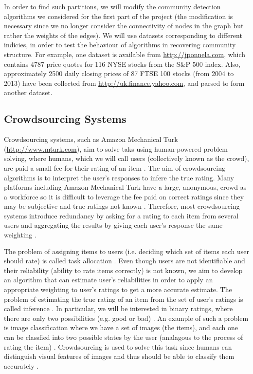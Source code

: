 \documentclass[12pt]{article}
\numberwithin{equation}{section}
\begin{document}
In order to find such partitions, we will modify the community detection algorithms we considered for the first part of the project (the modification is necessary since we no longer consider the connectivity of nodes in the graph but rather the weights of the edges). We will use datasets corresponding to different indicies, in order to test the behaviour of algorithms in recovering community structure. For example, one dataset is available from \url{http://jponnela.com}, which contains 4787 price quotes for 116 NYSE stocks from the S\&P 500 index. Also, approximately 2500 daily closing prices of 87 FTSE 100 stocks (from 2004 to 2013) have been collected from \url{http://uk.finance.yahoo.com}, and parsed to form another dataset.

\subsection{Crowdsourcing Systems}
\label{subsec:crowdsourcingSystems}

Crowdsourcing systems, such as Amazon Mechanical Turk (\url{http://www.mturk.com}), aim to solve taks using human-powered problem solving, where humans, which we will call users (collectively known as the crowd), are paid a small fee for their rating of an item \cite{KOS13,EHR12}. The aim of crowdsourcing algorithms is to interpret the user's responses to infere the true rating. Many platforms including Amazon Mechanical Turk have a large, anonymous, crowd as a workforce so it is difficult to leverage the fee paid on correct ratings since they may be subjective and true ratings not known \cite{KOS13}. Therefore, most crowdsourcing systems introduce redundancy by asking for a rating to each item from several users and aggregating the results by giving each user's response the same weighting \cite{GKM11,KOS13,DDK+13}.

The problem of assigning items to users (i.e. deciding which set of items each user should rate) is called task allocation \cite{KOS13}. Even though users are not identifiable and their reliability (ability to rate items correctly) is not known, we aim to develop an algorithm that can estimate user's reliabilities in order to apply an appropriate weighting to user's ratings to get a more accurate estimate. The problem of estimating the true rating of an item from the set of user's ratings is called inference \cite{KOS13}. In particular, we will be interested in binary ratings, where there are only two possibilities (e.g. good or bad) \cite{GKM11}. An example of such a problem is image classification where we have a set of images (the items), and each one can be classfied into two possible states by the user (analagous to the process of rating the item) \cite{KOS13, DKF13}. Crowdsourcing is used to solve this task since humans can distinguish visual features of images and thus should be able to classify them accurately \cite{DKF13}.
\end{document}
